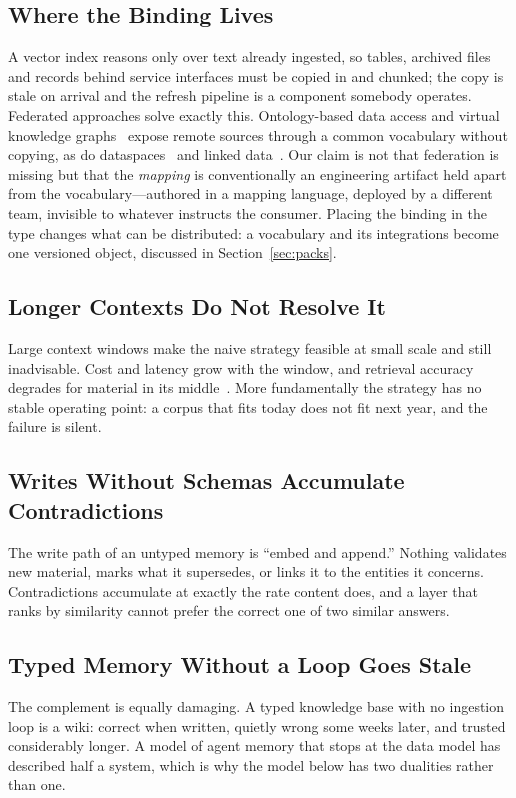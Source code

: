 \documentclass[journal,nofonttune]{IEEEtran}
\begin{document}
\subsection{Where the Binding Lives}
A vector index reasons only over text already ingested, so tables, archived
files and records behind service interfaces must be copied in and chunked;
the copy is stale on arrival and the refresh pipeline is a component somebody
operates. Federated approaches solve exactly this. Ontology-based data access
and virtual knowledge graphs~\cite{obda} expose remote sources through a
common vocabulary without copying, as do dataspaces~\cite{dataspaces} and
linked data~\cite{linkeddata}. Our claim is not that federation is missing
but that the \emph{mapping} is conventionally an engineering artifact held
apart from the vocabulary---authored in a mapping language, deployed by a
different team, invisible to whatever instructs the consumer. Placing the
binding in the type changes what can be distributed: a vocabulary and its
integrations become one versioned object, discussed in
Section~\ref{sec:packs}.

\subsection{Longer Contexts Do Not Resolve It}
Large context windows make the naive strategy feasible at small scale and
still inadvisable. Cost and latency grow with the window, and retrieval
accuracy degrades for material in its middle~\cite{lostmiddle}. More
fundamentally the strategy has no stable operating point: a corpus that fits
today does not fit next year, and the failure is silent.

\subsection{Writes Without Schemas Accumulate Contradictions}
The write path of an untyped memory is ``embed and append.'' Nothing
validates new material, marks what it supersedes, or links it to the entities
it concerns. Contradictions accumulate at exactly the rate content does, and
a layer that ranks by similarity cannot prefer the correct one of two similar
answers.

\subsection{Typed Memory Without a Loop Goes Stale}
The complement is equally damaging. A typed knowledge base with no ingestion
loop is a wiki: correct when written, quietly wrong some weeks later, and
trusted considerably longer. A model of agent memory that stops at the data
model has described half a system, which is why the model below has two
dualities rather than one.
\end{document}
